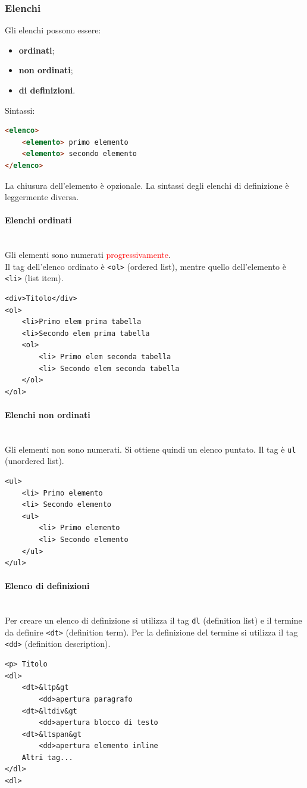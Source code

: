 \documentclass{article}
\begin{document}
\subsubsection{Elenchi}
Gli elenchi possono essere:
\begin{itemize}
    \item \textbf{ordinati};
    \item \textbf{non ordinati};
    \item \textbf{di definizioni}.
\end{itemize}
Sintassi:
\begin{lstlisting}[language=html]
<elenco>
    <elemento> primo elemento
    <elemento> secondo elemento
</elenco>
\end{lstlisting}
La chiusura dell'elemento è opzionale. La sintassi degli elenchi di definizione è leggermente diversa.
\paragraph{Elenchi ordinati} \mbox{} \\
Gli elementi sono numerati \textcolor{red}{progressivamente}.
\\ Il tag dell'elenco ordinato è \texttt{<ol>} (ordered list), mentre quello dell'elemento è \texttt{<li>} (list item).
\begin{lstlisting}[style=htmlstyle]
<div>Titolo</div>
<ol>
    <li>Primo elem prima tabella
    <li>Secondo elem prima tabella
    <ol>
        <li> Primo elem seconda tabella
        <li> Secondo elem seconda tabella
    </ol>
</ol>
\end{lstlisting}
\paragraph{Elenchi non ordinati} \mbox{} \\
Gli elementi non sono numerati. Si ottiene quindi un elenco puntato. Il tag è \texttt{ul} (unordered list).
\begin{lstlisting}[style=htmlstyle]
<ul>
    <li> Primo elemento
    <li> Secondo elemento
    <ul>
        <li> Primo elemento
        <li> Secondo elemento
    </ul>
</ul>
\end{lstlisting}
\paragraph{Elenco di definizioni} \mbox{}
\\ Per creare un elenco di definizione si utilizza il tag \texttt{dl} (definition list) e il termine da definire \texttt{<dt>} (definition term). Per la definizione del termine si utilizza il tag \texttt{<dd>} (definition description).
\begin{lstlisting}[style=htmlstyle]
<p> Titolo
<dl>
    <dt>&ltp&gt
        <dd>apertura paragrafo
    <dt>&ltdiv&gt
        <dd>apertura blocco di testo
    <dt>&ltspan&gt
        <dd>apertura elemento inline
    Altri tag...
</dl>
<dl>
\end{lstlisting}
\pagebreak
\end{document}

